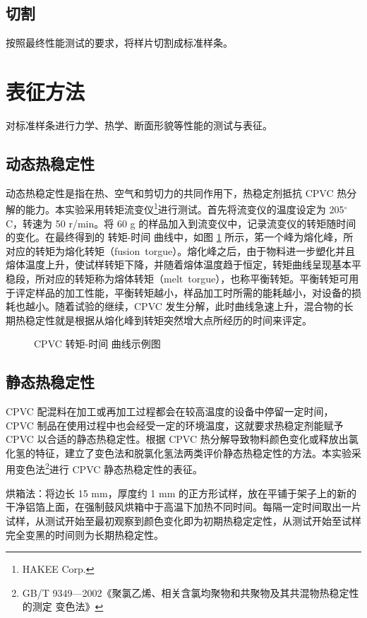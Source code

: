 \documentclass[a4paper, oneside, onecolumn, 12pt]{ctexrep}    %
\newcommand{\cd}{$^{\circ}$C}  %
\begin{document}
\subsection{切割}
按照最终性能测试的要求，将样片切割成标准样条。


\section{表征方法}
对标准样条进行力学、热学、断面形貌等性能的测试与表征。

\subsection{动态热稳定性}
动态热稳定性是指在热、空气和剪切力的共同作用下，热稳定剂抵抗 CPVC 热分解的能力。本实验采用转矩流变仪\footnote{HAKEE Corp.}进行测试。首先将流变仪的温度设定为 205\cd，转速为 50 r/min。将 60 g 的样品加入到流变仪中，记录流变仪的转矩随时间的变化。在最终得到的 转矩-时间 曲线中，如图 \ref{figExHakee} 所示，笫一个峰为熔化峰，所对应的转矩为熔化转矩（fusion torgue）。熔化峰之后，由于物料进一步塑化并且熔体温度上升，使试样转矩下降，并随着熔体温度趋于恒定，转矩曲线呈现基本平稳段，所对应的转矩称为熔体转矩（melt torgue），也称平衡转矩。平衡转矩可用于评定样品的加工性能，平衡转矩越小，样品加工时所需的能耗越小，对设备的损耗也越小。随着试验的继续，CPVC 发生分解，此时曲线急速上升，混合物的长期热稳定性就是根据从熔化峰到转矩突然增大点所经历的时间来评定。

\begin{figure}[htbp]
    \begin{center}
        
    \end{center}
    \caption{CPVC 转矩-时间 曲线示例图}
    \label{figExHakee}
\end{figure}

\subsection{静态热稳定性}
CPVC 配混料在加工或再加工过程都会在较高温度的设备中停留一定时间，CPVC 制品在使用过程中也会经受一定的环境温度，这就要求热稳定剂能赋予 CPVC 以合适的静态热稳定性。根据 CPVC 热分解导致物料颜色变化或释放出氯化氢的特征，建立了变色法和脱氯化氢法两类评价静态热稳定性的方法。本实验采用变色法\footnote{GB/T 9349—2002《聚氯乙烯、相关含氯均聚物和共聚物及其共混物热稳定性的测定 变色法》}进行 CPVC 静态热稳定性的表征。\par
烘箱法：将边长 15 mm，厚度约 1 mm 的正方形试样，放在平铺于架子上的新的干净铝箔上面，在强制鼓风烘箱中于高温下加热不同时间。每隔一定时间取出一片试样，从测试开始至最初观察到颜色变化即为初期热稳定定性，从测试开始至试样完全变黑的时间则为长期热稳定性。
\end{document}
